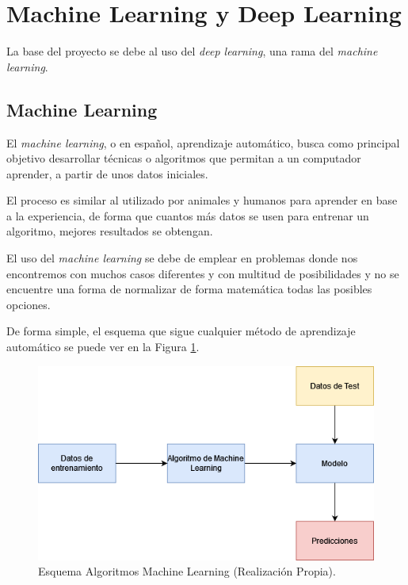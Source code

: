 
\section{Machine Learning y Deep Learning}
La base del proyecto se debe al uso del \emph{deep learning}, una rama del \emph{machine learning}.

\subsection{Machine Learning}
El \emph{machine learning}, o en español, aprendizaje automático, busca como principal objetivo desarrollar técnicas o algoritmos que permitan a un computador aprender, a partir de unos datos iniciales.

El proceso es similar al utilizado por animales y humanos para aprender en base a la experiencia, de forma que cuantos más datos se usen para entrenar un algoritmo, mejores resultados se obtengan.

El uso del \emph{machine learning} se debe de emplear en problemas donde nos encontremos con muchos casos diferentes y con multitud de posibilidades y no se encuentre una forma de normalizar de forma matemática todas las posibles opciones.

De forma simple, el esquema \cite{mitchell1997machine} que sigue cualquier método de aprendizaje automático se puede ver en la Figura \ref{esquemaML}.

\begin{figure}[h]
    \centering
    \includegraphics[scale=0.7]{img/Esquema_ML.png}
    \caption{Esquema Algoritmos Machine Learning (Realización Propia).}
    \label{esquemaML}
\end{figure}

